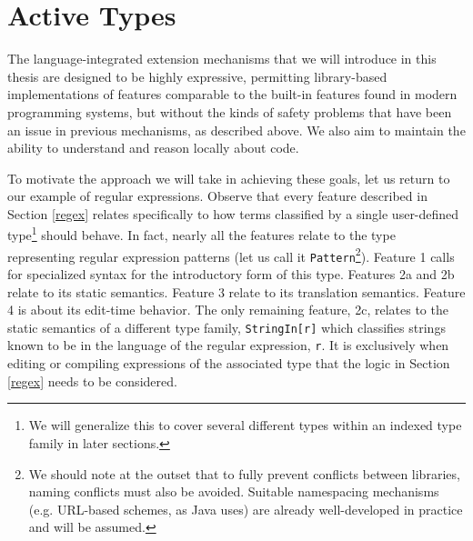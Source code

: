 \section{Active Types}\label{contributions}
The language-integrated extension mechanisms that we will introduce in this thesis are designed to be highly {expressive}, permitting library-based implementations of features comparable to the built-in features found in modern programming systems, but without the kinds of {safety} problems that have been an issue in previous mechanisms, as described above. We also aim to maintain the ability to understand and reason locally about code. %

To motivate the approach we will take in achieving these goals, let us return to our example of regular expressions. Observe that every feature described in Section \ref{regex} relates specifically to how terms  classified by a single user-defined type\footnote{We will generalize this to cover several different types within an indexed type family in later sections.} should behave. In fact, nearly all the features relate to the type representing regular expression patterns (let us call it \verb|Pattern|\footnote{We should note at the outset that to fully prevent conflicts between libraries, naming conflicts must also be avoided. Suitable namespacing mechanisms (e.g. URL-based schemes, as Java uses) are already well-developed in practice  and will be assumed.}). Feature 1 calls for specialized syntax for the introductory form of this type. Features 2a and 2b relate to its static semantics. Feature 3 relate to its translation semantics. Feature 4 is about its edit-time behavior. The only remaining feature, 2c, relates to the static semantics of a different type family, \verb|StringIn[r]| which classifies strings known to be in the language of the regular expression, \verb|r|. It is exclusively when editing or compiling expressions of the associated type that the logic in Section \ref{regex}  needs to be considered. 


